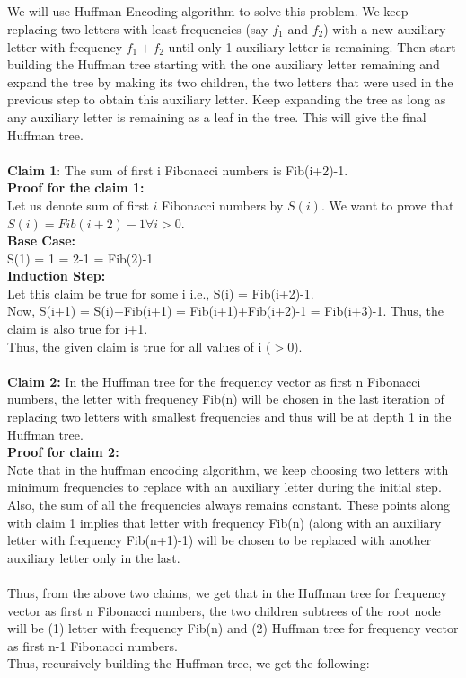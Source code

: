 \documentclass{article}
\begin{document}
\subsection{}
We will use Huffman Encoding algorithm to solve this problem. We keep replacing two letters with least frequencies (say $f_1$ and $f_2$) with a new auxiliary letter with frequency $f_1+f_2$ until only 1 auxiliary letter is remaining. Then start building the Huffman tree starting with the one auxiliary letter remaining and expand the tree by making its two children, the two letters that were used in the previous step to obtain this auxiliary letter. Keep expanding the tree as long as any auxiliary letter is remaining as a leaf in the tree. This will give the final Huffman tree.
\\
\\
\textbf{Claim 1}: The sum of first i Fibonacci numbers is Fib(i+2)-1.
\\
\textbf{Proof for the claim 1:}
\\
Let us denote sum of first $i$ Fibonacci numbers by $S(i)$. We want to prove that $S(i) = Fib(i+2)-1 \forall i>0$.
\\
\textbf{Base Case: }
\\
S(1) = 1 = 2-1 = Fib(2)-1
\\
\textbf{Induction Step:}
\\
Let this claim be true for some i i.e., S(i) = Fib(i+2)-1. 
\\Now, S(i+1) = S(i)+Fib(i+1) = Fib(i+1)+Fib(i+2)-1 = Fib(i+3)-1. Thus, the claim is also true for i+1. \\Thus, the given claim is true for all values of i ($>$0).
\\\\
\textbf{Claim 2:} In the Huffman tree for the frequency vector as first n Fibonacci numbers, the letter with frequency Fib(n) will be chosen in the last iteration of replacing two letters with smallest frequencies and thus will be at depth 1 in the Huffman tree.
\\
\textbf{Proof for claim 2:}
\\
Note that in the huffman encoding algorithm, we keep choosing two letters with minimum frequencies to replace with an auxiliary letter during the initial step. Also, the sum of all the frequencies always remains constant. These points along with claim 1 implies that letter with frequency Fib(n) (along with an auxiliary letter with frequency Fib(n+1)-1) will be chosen to be replaced with another auxiliary letter only in the last.
\\\\
Thus, from the above two claims, we get that in the Huffman tree for frequency vector as first n Fibonacci numbers, the two children subtrees of the root node will be (1) letter with frequency Fib(n) and (2) Huffman tree for frequency vector as first n-1 Fibonacci numbers.
\\
Thus, recursively building the Huffman tree, we get the following:
\end{document}
